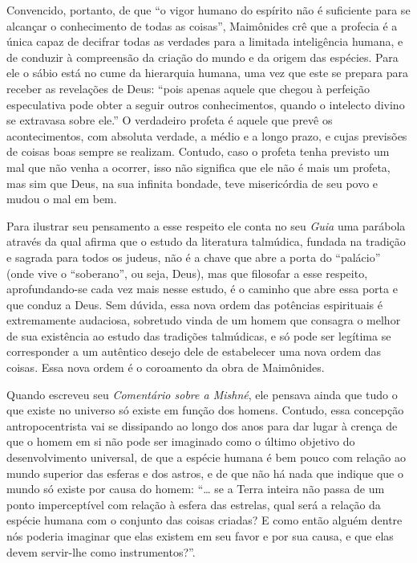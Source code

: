 Convencido, portanto, de que ``o vigor humano do espírito não é
suficiente para se alcançar o conhecimento de todas as coisas'',
Maimônides crê que a profecia é a única capaz de decifrar todas as
verdades para a limitada inteligência humana, e de conduzir à
compreensão da criação do mundo e da origem das espécies. Para ele o
sábio está no cume da hierarquia humana, uma vez que este se prepara
para receber as revelações de Deus: ``pois apenas aquele que chegou à
perfeição especulativa pode obter a seguir outros conhecimentos, quando
o intelecto divino se extravasa sobre ele.'' O verdadeiro profeta é
aquele que prevê os acontecimentos, com absoluta verdade, a médio e a
longo prazo, e cujas previsões de coisas boas sempre se realizam.
Contudo, caso o profeta tenha previsto um mal que não venha a ocorrer,
isso não significa que ele não é mais um profeta, mas sim que Deus, na
sua infinita bondade, teve misericórdia de seu povo e mudou o mal em
bem.

Para ilustrar seu pensamento a esse respeito ele conta no seu
\emph{Guia} uma parábola através da qual afirma que o estudo da
literatura talmúdica, fundada na tradição e sagrada para todos os
judeus, não é a chave que abre a porta do ``palácio'' (onde vive o
``soberano'', ou seja, Deus), mas que filosofar a esse respeito,
aprofundando-se cada vez mais nesse estudo, é o caminho que abre essa
porta e que conduz a Deus. Sem dúvida, essa nova ordem das potências
espirituais é extremamente audaciosa, sobretudo vinda de um homem que
consagra o melhor de sua existência ao estudo das tradições talmúdicas,
e só pode ser legítima se corresponder a um autêntico desejo dele de
estabelecer uma nova ordem das coisas. Essa nova ordem é o coroamento
da obra de Maimônides.

Quando escreveu seu \emph{Comentário sobre a Mishné}, ele pensava ainda
que tudo o que existe no universo só existe em função dos homens.
Contudo, essa concepção antropocentrista vai se dissipando ao longo dos
anos para dar lugar à crença de que o homem em si não pode ser imaginado
como o último objetivo do desenvolvimento universal, de que a espécie
humana é bem pouco com relação ao mundo superior das esferas e dos
astros, e de que não há nada que indique que o mundo só existe por causa
do homem: ``\ldots{} se a Terra inteira não passa de um ponto imperceptível
com relação à esfera das estrelas, qual será a relação da espécie
humana com o conjunto das coisas criadas? E como então alguém dentre nós
poderia imaginar que elas existem em seu favor e por sua causa, e que
elas devem servir-lhe como instrumentos?''.

